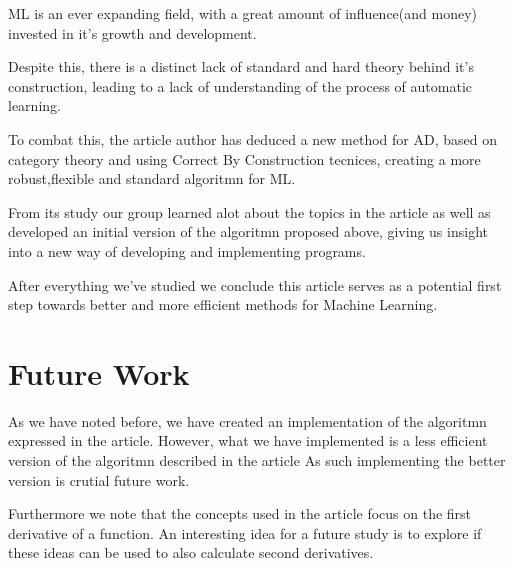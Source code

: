 \documentclass[11pt,a4]{article}
\theoremstyle{definition}
\theoremstyle{Definition}
\theoremstyle{Definition}
\begin{document}
	ML is an ever expanding field, with a great amount of influence(and money) invested in it's growth and development.

	Despite this, there is a distinct lack of standard and hard theory behind it's construction, leading to a lack of understanding of the process of automatic learning.

	To combat this, the article author has deduced a new method for AD, based on category theory and using Correct By Construction tecnices, creating a more robust,flexible and standard algoritmn for ML.

	From its study our group learned alot about the topics in the article as well as developed an initial version of the algoritmn proposed above, giving us insight into a new way of developing and implementing programs.

	After everything we've studied we conclude this article serves as a potential first step towards better and more efficient methods for Machine Learning.



	\section{Future Work}

	As we have noted before, we have created an implementation of the algoritmn expressed in the article.
	However, what we have implemented is a less efficient version of the algoritmn described in the article
	As such implementing the better version is crutial future work.

	Furthermore we note that the concepts used in the article focus on the first derivative of a function.
	An interesting idea for a future study is to explore if these ideas can be used to also calculate second derivatives.
	
	
	\newpage



    
\end{document}
